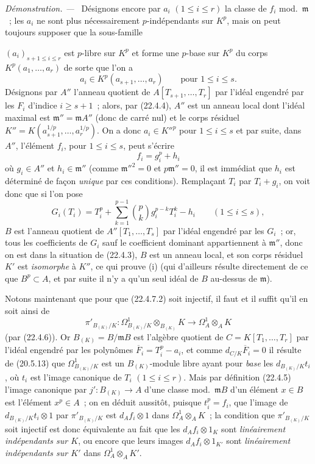 \documentclass[10pt,oneside]{book}
\newcommand{\oldpage}[2][]{%
  \setcounter{footnote}{0}%
  \marginpar{\scriptsize\textbf{#1}~|~#2}\ignorespaces}
\newenvironment{proof}{%
  \par\medskip\noindent\textit{Démonstration. ---\ }}{\par}
\begin{document}
\begin{proof}
Désignons encore par $a_i$ $(1\leqslant i\leqslant r)$ la classe de $f_i$
mod.~$\mathfrak m$~; les $a_i$ ne sont plus nécessairement $p$-indépendants
sur $K^p$, mais on peut toujours supposer que la sous-famille

\oldpage[0\textsubscript{IV-1}]{199}

$(a_i)_{s+1\leqslant i\leqslant r}$ est $p$-libre sur $K^p$ et forme une
$p$-base sur $K^p$ du corps $K^p(a_1,\ldots,a_r)$ de sorte que l'on a
\[
  a_i\in K^p(a_{s+1},\ldots,a_r)\qquad\text{pour }1\leqslant i\leqslant s.
\]
Désignons par $A''$ l'anneau quotient de $A[T_{s+1},\ldots,T_r]$ par l'idéal
engendré par les $F_i$ d'indice $i\geqslant s+1$~; alors, par (22.4.4), $A''$
est un anneau local dont l'idéal maximal est $\mathfrak m''=\mathfrak mA''$
(donc de carré nul) et le corps résiduel
$K''=K(a_{s+1}^{1/p},\ldots,a_r^{1/p})$. On a donc
$a_i\in K''^p$ pour $1\leqslant i\leqslant s$ et par suite, dans $A''$,
l'élément $f_i$, pour $1\leqslant i\leqslant s$, peut s'écrire
\begin{equation}
\label{0.22.4.7.3-fr}
  f_i=g_i^p+h_i
  \tag{22.4.7.3}
\end{equation}
où $g_i\in A''$ et $h_i\in\mathfrak m''$ (comme $\mathfrak m''^2=0$ et
$p\mathfrak m''=0$, il est immédiat que $h_i$ est déterminé de façon
\emph{unique} par ces conditions). Remplaçant $T_i$ par $T_i+g_i$, on voit donc
que si l'on pose
\[
  G_i(T_i)=T_i^p+\sum_{k=1}^{p-1}\binom pk g_i^{p-k}T_i^k-h_i
  \qquad(1\leqslant i\leqslant s),
\]
$B$ est l'anneau quotient de $A''[T_1,\ldots,T_s]$ par l'idéal engendré par les
$G_i$~; or, tous les coefficients de $G_i$ sauf le coefficient dominant
appartiennent à $\mathfrak m''$, donc on est dans la situation de (22.4.3),
$B$ est un anneau local, et son corps résiduel $K'$ est \emph{isomorphe} à
$K''$, ce qui prouve (i) (qui d'ailleurs résulte directement de ce que
$B^p\subset A$, et par suite il n'y a qu'un seul idéal de $B$ au-dessus de
$\mathfrak m$).

Notons maintenant que pour que (22.4.7.2) soit injectif, il faut et il suffit
qu'il en soit ainsi de
\[
  \pi'_{B_{(K)}/K}:\Omega^1_{B_{(K)}/K}\otimes_{B_{(K)}}K
  \longrightarrow\Omega^1_A\otimes_AK
\]
(par (22.4.6)). Or $B_{(K)}=B/\mathfrak mB$ est l'algèbre quotient de
$C=K[T_1,\ldots,T_r]$ par l'idéal engendré par les polynômes
$\overline F_i=T_i^p-a_i$, et comme $d_{C/K}\overline F_i=0$ il résulte de
(20.5.13) que $\Omega^1_{B_{(K)}/K}$ est un $B_{(K)}$-module libre ayant pour
\emph{base} les $d_{B_{(K)}/K}t_i$, où $t_i$ est l'image canonique de $T_i$
$(1\leqslant i\leqslant r)$. Mais par définition (22.4.5) l'image canonique par
$j':B_{(K)}\longrightarrow A$ d'une classe mod.~$\mathfrak mB$ d'un élément
$x\in B$ est l'élément $x^p\in A$~; on en déduit aussitôt, puisque $t_i^p=f_i$,
que l'image de $d_{B_{(K)}/K}t_i\otimes1$ par $\pi'_{B_{(K)}/K}$ est
$d_Af_i\otimes1$ dans $\Omega^1_A\otimes_AK$~; la condition que
$\pi'_{B_{(K)}/K}$ soit injectif est donc équivalente au fait que les
$d_Af_i\otimes1_K$ sont \emph{linéairement indépendants sur $K$}, ou encore
que leurs images $d_Af_i\otimes1_{K'}$ sont \emph{linéairement indépendants
sur $K'$} dans $\Omega^1_A\otimes_AK'$.


\end{proof}
\end{document}
